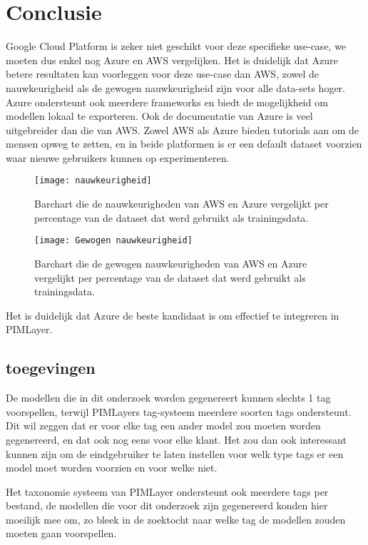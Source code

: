 \chapter{Conclusie}%
\label{ch:conclusie}

Google Cloud Platform is zeker niet geschikt voor deze specifieke use-case, we moeten dus enkel nog Azure en AWS vergelijken.
Het is duidelijk dat Azure betere resultaten kan voorleggen voor deze use-case dan AWS, zowel de nauwkeurigheid als de gewogen nauwkeurigheid zijn voor alle data-sets hoger. Azure ondersteunt ook meerdere frameworks en biedt de mogelijkheid om modellen lokaal te exporteren. Ook de documentatie van Azure is veel uitgebreider dan die van AWS. Zowel AWS als Azure bieden tutorials aan om de mensen opweg te zetten, en in beide platformen is er een default dataset voorzien waar nieuwe gebruikers kunnen op experimenteren. 
\begin{figure}[h]
    \caption{Barchart die de nauwkeurigheden van AWS en Azure vergelijkt per percentage van de dataset dat werd gebruikt als trainingsdata.}
    \centering
    \texttt{[image: nauwkeurigheid]}
\end{figure}

\begin{figure}[h]
    \caption{Barchart die de gewogen nauwkeurigheden van AWS en Azure vergelijkt per percentage van de dataset dat werd gebruikt als trainingsdata.}
    \centering
    \texttt{[image: Gewogen nauwkeurigheid]}
\end{figure}

Het is duidelijk dat Azure de beste kandidaat is om effectief te integreren in PIMLayer.


\section{toegevingen}
De modellen die in dit onderzoek worden gegenereert kunnen slechts 1 tag voorspellen, terwijl PIMLayers tag-systeem meerdere soorten tags ondersteunt. Dit wil zeggen dat er voor elke tag een ander model zou moeten worden gegenereerd, en dat ook nog eens voor elke klant. Het zou dan ook interessant kunnen zijn om de eindgebruiker te laten instellen voor welk type tags er een model moet worden voorzien en voor welke niet.

Het taxonomie systeem van PIMLayer ondersteunt ook meerdere tags per bestand, de modellen die voor dit onderzoek zijn gegenereerd konden hier moeilijk mee om, zo bleek in de zoektocht naar welke tag de modellen zouden moeten gaan voorspellen. 

